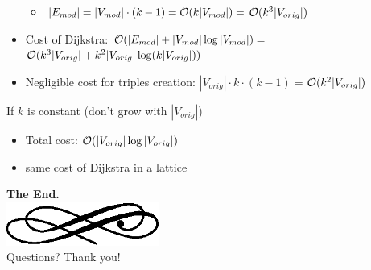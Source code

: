 \begin{frame}
\begin{itemize}
    \begin{itemize}
    \item $|E_{mod}|=|V_{mod}|\cdot (k-1)=\mathcal{O}(k|V_{mod}|)=$\alert{$\mathcal{O}(k^3|V_{orig}|)$}\pause
    \end{itemize}
  \item Cost of \alert{Dijkstra}: $\mathcal{O}(|E_{mod}|+|V_{mod}|\log
    |V_{mod}|)=$\alert{$\mathcal{O}(k^3|V_{orig}|+ k^2|V_{orig}|\log(k|V_{orig}|))$}\pause
  \item Negligible cost for triples \alert{creation}: $|V_{orig}|\cdot k\cdot
    (k-1)=$\alert{$\mathcal{O}(k^2|V_{orig}|)$}\pause
  \end{itemize}

  \begin{block}{If $k$ is constant (don't grow with $|V_{orig}|$)}
    \begin{itemize}
    \item Total cost: \alert{$\mathcal{O}(|V_{orig}|\log|V_{orig}|)$}\pause
    \item same cost of Dijkstra in a lattice
    \end{itemize}
  \end{block}
\end{frame}

\begin{frame}
  \begin{center}
	\textbf{\calligra\Huge The End.}\\
  \includegraphics[width=5cm]{img/ornament.eps}\\[1cm]
	\pause
	{\huge\calligra Questions?\pause{} Thank you!}
  \end{center}
\end{frame}
